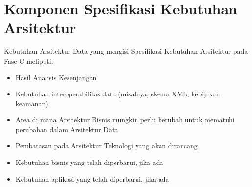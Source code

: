 \section{Komponen Spesifikasi Kebutuhan Arsitektur}
\label{sec:data_komponen_spesifikasi_kebutuhan}
Kebutuhan Arsitektur Data yang mengisi Spesifikasi Kebutuhan Arsitektur pada Fase C meliputi:
\begin{itemize}
	\item Hasil Analisis Kesenjangan
	\item Kebutuhan interoperabilitas data (misalnya, skema XML, kebijakan keamanan)
	\item Area di mana Arsitektur Bisnis mungkin perlu berubah untuk mematuhi perubahan dalam Arsitektur Data
	\item Pembatasan pada Arsitektur Teknologi yang akan dirancang
	\item Kebutuhan bisnis yang telah diperbarui, jika ada
	\item Kebutuhan aplikasi yang telah diperbarui, jika ada
\end{itemize}

